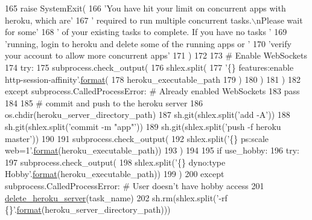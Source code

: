 \begin{DoxyCode}
165         \textcolor{keywordflow}{raise} SystemExit(
166             \textcolor{stringliteral}{'You have hit your limit on concurrent apps with heroku, which are'}
167             \textcolor{stringliteral}{' required to run multiple concurrent tasks.\(\backslash\)nPlease wait for some'}
168             \textcolor{stringliteral}{' of your existing tasks to complete. If you have no tasks '}
169             \textcolor{stringliteral}{'running, login to heroku and delete some of the running apps or '}
170             \textcolor{stringliteral}{'verify your account to allow more concurrent apps'}
171         )
172 
173     \textcolor{comment}{# Enable WebSockets}
174     \textcolor{keywordflow}{try}:
175         subprocess.check\_output(
176             shlex.split(
177                 \textcolor{stringliteral}{'\{\} features:enable http-session-affinity'}.\hyperlink{namespaceparlai_1_1chat__service_1_1services_1_1messenger_1_1shared__utils_a32e2e2022b824fbaf80c747160b52a76}{format}(
178                     heroku\_executable\_path
179                 )
180             )
181         )
182     \textcolor{keywordflow}{except} subprocess.CalledProcessError:  \textcolor{comment}{# Already enabled WebSockets}
183         \textcolor{keywordflow}{pass}
184 
185     \textcolor{comment}{# commit and push to the heroku server}
186     os.chdir(heroku\_server\_directory\_path)
187     sh.git(shlex.split(\textcolor{stringliteral}{'add -A'}))
188     sh.git(shlex.split(\textcolor{stringliteral}{'commit -m "app"'}))
189     sh.git(shlex.split(\textcolor{stringliteral}{'push -f heroku master'}))
190 
191     subprocess.check\_output(
192         shlex.split(\textcolor{stringliteral}{'\{\} ps:scale web=1'}.\hyperlink{namespaceparlai_1_1chat__service_1_1services_1_1messenger_1_1shared__utils_a32e2e2022b824fbaf80c747160b52a76}{format}(heroku\_executable\_path))
193     )
194 
195     \textcolor{keywordflow}{if} use\_hobby:
196         \textcolor{keywordflow}{try}:
197             subprocess.check\_output(
198                 shlex.split(\textcolor{stringliteral}{'\{\} dyno:type Hobby'}.\hyperlink{namespaceparlai_1_1chat__service_1_1services_1_1messenger_1_1shared__utils_a32e2e2022b824fbaf80c747160b52a76}{format}(heroku\_executable\_path))
199             )
200         \textcolor{keywordflow}{except} subprocess.CalledProcessError:  \textcolor{comment}{# User doesn't have hobby access}
201             \hyperlink{namespaceparlai_1_1mturk_1_1core_1_1server__utils_a8dfde882f9d6ff492ca565ae2334fc70}{delete\_heroku\_server}(task\_name)
202             sh.rm(shlex.split(\textcolor{stringliteral}{'-rf \{\}'}.\hyperlink{namespaceparlai_1_1chat__service_1_1services_1_1messenger_1_1shared__utils_a32e2e2022b824fbaf80c747160b52a76}{format}(heroku\_server\_directory\_path)))

\end{DoxyCode}

